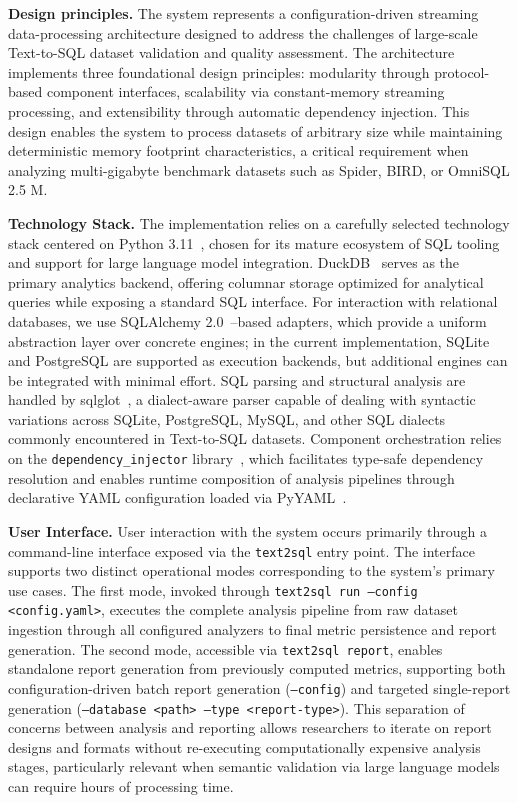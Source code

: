 \documentclass[]{einformatica}
\begin{document}
\textbf{Design principles.} The system represents a configuration-driven streaming data-processing architecture designed to address the challenges of large-scale Text-to-SQL dataset validation and quality assessment. The architecture implements three foundational design principles: modularity through protocol-based component interfaces, scalability via constant-memory streaming processing, and extensibility through automatic dependency injection. This design enables the system to process datasets of arbitrary size while maintaining deterministic memory footprint characteristics, a critical requirement when analyzing multi-gigabyte benchmark datasets such as Spider, BIRD, or OmniSQL 2.5 M.

\textbf{Technology Stack.} The implementation relies on a carefully selected technology stack centered on Python 3.11~\cite{pythonDocs311}, chosen for its mature ecosystem of SQL tooling and support for large language model integration. DuckDB~\cite{duckdbDocs} serves as the primary analytics backend, offering columnar storage optimized for analytical queries while exposing a standard SQL interface. For interaction with relational databases, we use SQLAlchemy 2.0~\cite{sqlalchemyDocs20}--based adapters, which provide a uniform abstraction layer over concrete engines; in the current implementation, SQLite and PostgreSQL are supported as execution backends, but additional engines can be integrated with minimal effort. SQL parsing and structural analysis are handled by sqlglot~\cite{sqlglotRepo}, a dialect-aware parser capable of dealing with syntactic variations across SQLite, PostgreSQL, MySQL, and other SQL dialects commonly encountered in Text-to-SQL datasets. Component orchestration relies on the \texttt{dependency\_injector} library~\cite{dependencyInjectorDocs}, which facilitates type-safe dependency resolution and enables runtime composition of analysis pipelines through declarative YAML configuration loaded via PyYAML~\cite{pyyaml}. 

\textbf{User Interface.} User interaction with the system occurs primarily through a command-line interface exposed via the \texttt{text2sql} entry point. The interface supports two distinct operational modes corresponding to the system's primary use cases. The first mode, invoked through \texttt{text2sql run --config <config.yaml>}, executes the complete analysis pipeline from raw dataset ingestion through all configured analyzers to final metric persistence and report generation. The second mode, accessible via \texttt{text2sql report}, enables standalone report generation from previously computed metrics, supporting both configuration-driven batch report generation (\texttt{--config}) and targeted single-report generation (\texttt{--database <path> --type <report-type>}). This separation of concerns between analysis and reporting allows researchers to iterate on report designs and formats without re-executing computationally expensive analysis stages, particularly relevant when semantic validation via large language models can require hours of processing time.
\end{document}
